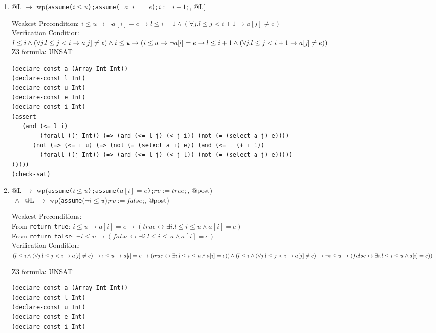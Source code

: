 \documentclass{article}
\begin{document}
\begin{enumerate}
\begin{enumerate}[(1)]
\item @L $\to$ wp(\verb|assume(|$i\leq u$\verb|);assume(|$\neg a[i]=e$\verb|);|$i:=i+1;$, @L)

	Weakest Precondition:
	$i\leq u \to \neg a[i]=e \to l \leq i+1 \land (\forall j. l\leq j < i+1 \to a[j] \neq e)$\\
	Verification Condition:\\
	$l \leq i \land (\forall j. l\leq j < i \to a[j] \neq e) \land i\leq u \\
	\to (i\leq u \to \neg a[i]=e \to l \leq i+1 \land (\forall j. l\leq j < i+1 \to a[j] \neq e))$\\
	Z3 formula: UNSAT
\begin{verbatim}
(declare-const a (Array Int Int))
(declare-const l Int)
(declare-const u Int)
(declare-const e Int)
(declare-const i Int)
(assert
   (and (<= l i)
        (forall ((j Int)) (=> (and (<= l j) (< j i)) (not (= (select a j) e)))) 
      (not (=> (<= i u) (=> (not (= (select a i) e)) (and (<= l (+ i 1)) 
        (forall ((j Int)) (=> (and (<= l j) (< j l)) (not (= (select a j) e)))))
)))))
(check-sat)
\end{verbatim}

\item @L $\to$ wp(\verb|assume(|$i\leq u$\verb|);assume(|$a[i]=e$\verb|);|$rv:=true;$, @post) \\
    $\ \land\ $ @L $\to$ wp(\verb|assume|($\neg i\leq u$);$rv:=false$;, @post)

	Weakest Preconditions: \\
	From \verb|return true|:  $i\leq u \to a[i]=e \to (true \leftrightarrow \exists i. l \leq i \leq u \land a[i] = e)$\\
	From \verb|return false|: $\neg i\leq u \to (false \leftrightarrow \exists i. l \leq i \leq u \land a[i] = e)$\\
	Verification Condition:\\
	$(l \leq i \land (\forall j. l\leq j < i \to a[j] \neq e)
	\to i\leq u \to a[i]=e \to (true \leftrightarrow \exists i. l \leq i \leq u \land a[i] = e)) \\
	\land (l \leq i \land (\forall j. l\leq j < i \to a[j] \neq e)
	\to \neg i\leq u \to (false \leftrightarrow \exists i. l \leq i \leq u \land a[i] = e))$

\newpage

	Z3 formula: UNSAT
\begin{verbatim}
(declare-const a (Array Int Int))
(declare-const l Int)
(declare-const u Int)
(declare-const e Int)
(declare-const i Int)


\end{verbatim}
\end{enumerate}
\end{enumerate}
\end{document}
